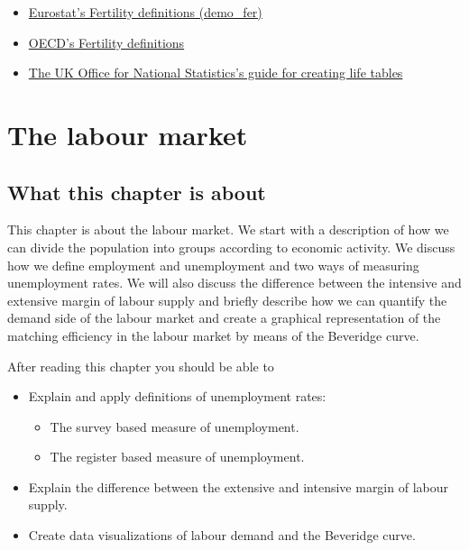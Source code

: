 \documentclass[
]{book}
\providecommand{\tightlist}{%
  \setlength{\itemsep}{0pt}\setlength{\parskip}{0pt}}
\begin{document}
\begin{itemize}
\item
  \href{https://ec.europa.eu/eurostat/cache/metadata/en/demo_fer_esms.htm}{Eurostat's Fertility definitions (demo\_fer)}
\item
  \href{https://data.oecd.org/pop/fertility-rates.htm}{OECD's Fertility definitions}
\item
  \href{https://www.ons.gov.uk/peoplepopulationandcommunity/healthandsocialcare/healthandlifeexpectancies/methodologies/guidetocalculatingnationallifetables}{The UK Office for National Statistics's guide for creating life tables}
\end{itemize}

\hypertarget{the-labour-market}{%
\chapter{The labour market}\label{the-labour-market}}

\hypertarget{what-this-chapter-is-about-1}{%
\section{What this chapter is about}\label{what-this-chapter-is-about-1}}

This chapter is about the labour market. We start with a description of how we can divide the population into groups according to economic activity. We discuss how we define employment and unemployment and two ways of measuring unemployment rates. We will also discuss the difference between the intensive and extensive margin of labour supply and briefly describe how we can quantify the demand side of the labour market and create a graphical representation of the matching efficiency in the labour market by means of the Beveridge curve.

After reading this chapter you should be able to

\begin{itemize}
\tightlist
\item
  Explain and apply definitions of unemployment rates:

  \begin{itemize}
  \tightlist
  \item
    The survey based measure of unemployment.
  \item
    The register based measure of unemployment.
  \end{itemize}
\item
  Explain the difference between the extensive and intensive margin of labour supply.
\item
  Create data visualizations of labour demand and the Beveridge curve.
\end{itemize}
\end{document}
